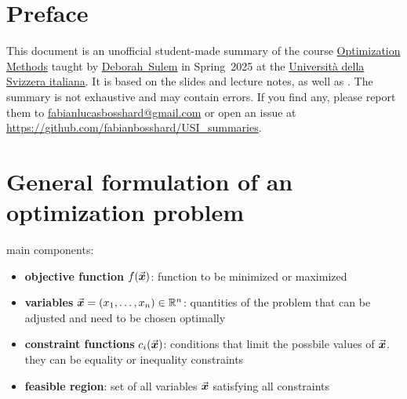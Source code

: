 \section*{Preface}

This document is an unofficial student-made summary of the course 
\href{https://search.usi.ch/en/courses/35270756/optimization-methods}{{Optimization Methods}} taught by \href{https://search.usi.ch/en/people/7ae0ccfefe31ec77de71003997572fbd/sulem-deborah}{Deborah~Sulem} in Spring~2025 at the \href{https://www.usi.ch/en}{Università della Svizzera italiana}.
It is based on the slides and lecture notes, as well as \cite{nocedal2006}.
The summary is not exhaustive and may contain errors.
If you find any, please report them to \href{mailto:fabianlucasbosshard@gmail.com}{fabianlucasbosshard@gmail.com} or open an issue at \url{https://github.com/fabianbosshard/USI_summaries}.

\doclicenseThis

\renewcommand{\emph}[1]{\textcolor{black}{#1}}
\printbibliography[heading=bibintoc,title={References}]
\renewcommand{\emph}[1]{\textcolor{mypurple}{#1}}













\clearpage
{}
\pagestyle{scrheadings}
\section{General formulation of an optimization problem}

main components:
\begin{itemize}
	\item \textbf{objective function} $f(\vec{\boldsymbol{x}})$: function to be minimized or maximized
	\item \textbf{variables} $\vec{\boldsymbol{x}} = (x_1, \ldots, x_n) \in \mathbb{R}^n$: quantities of the problem that can be adjusted and need to be chosen \emph{optimally}
	\item \textbf{constraint functions} $c_i(\vec{\boldsymbol{x}})$: conditions that limit the possbile values of $\vec{\boldsymbol{x}}$. they can be \emph{equality} or \emph{inequality} constraints
	\item \textbf{feasible region}: set of all variables $\vec{\boldsymbol{x}}$ satisfying all constraints
\end{itemize}

